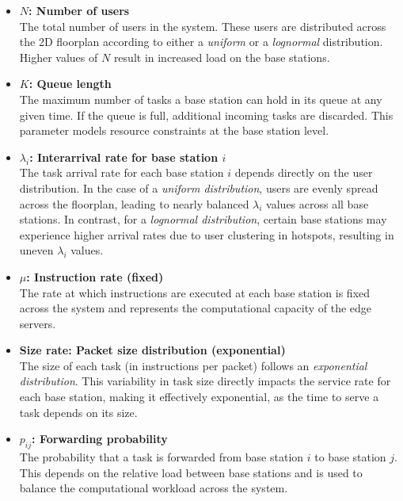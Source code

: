 \documentclass{report}
\begin{document}
\begin{itemize}
    \item \textbf{$N$: Number of users} \\
    The total number of users in the system. These users are distributed across the 2D floorplan according to either a \textit{uniform} or a \textit{lognormal} distribution. Higher values of $N$ result in increased load on the base stations.

    \item \textbf{$K$: Queue length} \\
    The maximum number of tasks a base station can hold in its queue at any given time. If the queue is full, additional incoming tasks are discarded. This parameter models resource constraints at the base station level.

    \item \textbf{$\lambda_i$: Interarrival rate for base station $i$} \\
    The task arrival rate for each base station $i$ depends directly on the user distribution. In the case of a \textit{uniform distribution}, users are evenly spread across the floorplan, leading to nearly balanced $\lambda_i$ values across all base stations. In contrast, for a \textit{lognormal distribution}, certain base stations may experience higher arrival rates due to user clustering in hotspots, resulting in uneven $\lambda_i$ values.

    \item \textbf{$\mu$: Instruction rate (fixed)} \\
    The rate at which instructions are executed at each base station is fixed across the system and represents the computational capacity of the edge servers.

    \item \textbf{Size rate: Packet size distribution (exponential)} \\
    The size of each task (in instructions per packet) follows an \textit{exponential distribution}. This variability in task size directly impacts the service rate for each base station, making it effectively exponential, as the time to serve a task depends on its size.

    \item \textbf{$p_{ij}$: Forwarding probability} \\
    The probability that a task is forwarded from base station $i$ to base station $j$. This depends on the relative load between base stations and is used to balance the computational workload across the system.


\end{itemize}
\end{document}
